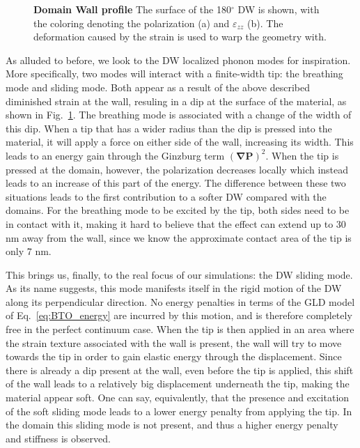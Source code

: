 \begin{figure}[h]
	\caption{\label{fig:BTO_wall} {\bf Domain Wall profile} The surface of the 180$^\circ$ DW is shown, with the coloring denoting the polarization (a) and $\varepsilon_{zz}$ (b). The deformation caused by the strain is used to warp the geometry with.}
\end{figure}
As alluded to before, we look to the DW localized phonon modes for inspiration.
More specifically, two modes will interact with a finite-width tip: the breathing mode and sliding mode.
Both appear as a result of the above described diminished strain at the wall, resuling in a dip at the surface of the material, as shown in Fig.~\ref{fig:BTO_wall}.
The breathing mode is associated with a change of the width of this dip.
When a tip that has a wider radius than the dip is pressed into the material, it will apply a force on either side of the wall, increasing its width.
This leads to an energy gain through the Ginzburg term $(\bm{\nabla}\bm{P})^2$.
When the tip is pressed at the domain, however, the polarization decreases locally which instead leads to an increase of this part of the energy.
The difference between these two situations leads to the first contribution to a softer DW compared with the domains.
For the breathing mode to be excited by the tip, both sides need to be in contact with it, making it hard to believe that the effect can extend up to 30 nm away from the wall, since we know the approximate contact area of the tip is only 7 nm. 

This brings us, finally, to the real focus of our simulations: the DW sliding mode.
As its name suggests, this mode manifests itself in the rigid motion of the DW along its perpendicular direction.
No energy penalties in terms of the GLD model of Eq.~\ref{eq:BTO_energy} are incurred by this motion, and is therefore completely free in the perfect continuum case.
When the tip is then applied in an area where the strain texture associated with the wall is present, the wall will try to move towards the tip in order to gain elastic energy through the displacement.
Since there is already a dip present at the wall, even before the tip is applied, this shift of the wall leads to a relatively big displacement underneath the tip, making the material appear soft.
One can say, equivalently, that the presence and excitation of the soft sliding mode leads to a lower energy penalty from applying the tip.
In the domain this sliding mode is not present, and thus a higher energy penalty and stiffness is observed.

